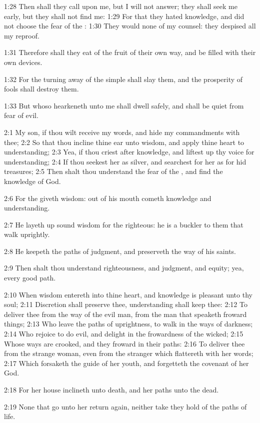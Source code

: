 1:28 Then shall they call upon me, but I will not answer; they shall
seek me early, but they shall not find me: 1:29 For that they hated
knowledge, and did not choose the fear of the \LORD: 1:30 They would
none of my counsel: they despised all my reproof.

1:31 Therefore shall they eat of the fruit of their own way, and be
filled with their own devices.

1:32 For the turning away of the simple shall slay them, and the
prosperity of fools shall destroy them.

1:33 But whoso hearkeneth unto me shall dwell safely, and shall be
quiet from fear of evil.

2:1 My son, if thou wilt receive my words, and hide my commandments
with thee; 2:2 So that thou incline thine ear unto wisdom, and apply
thine heart to understanding; 2:3 Yea, if thou criest after knowledge,
and liftest up thy voice for understanding; 2:4 If thou seekest her as
silver, and searchest for her as for hid treasures; 2:5 Then shalt
thou understand the fear of the \LORD, and find the knowledge of God.

2:6 For the \LORD giveth wisdom: out of his mouth cometh knowledge and
understanding.

2:7 He layeth up sound wisdom for the righteous: he is a buckler to
them that walk uprightly.

2:8 He keepeth the paths of judgment, and preserveth the way of his
saints.

2:9 Then shalt thou understand righteousness, and judgment, and
equity; yea, every good path.

2:10 When wisdom entereth into thine heart, and knowledge is pleasant
unto thy soul; 2:11 Discretion shall preserve thee, understanding
shall keep thee: 2:12 To deliver thee from the way of the evil man,
from the man that speaketh froward things; 2:13 Who leave the paths of
uprightness, to walk in the ways of darkness; 2:14 Who rejoice to do
evil, and delight in the frowardness of the wicked; 2:15 Whose ways
are crooked, and they froward in their paths: 2:16 To deliver thee
from the strange woman, even from the stranger which flattereth with
her words; 2:17 Which forsaketh the guide of her youth, and forgetteth
the covenant of her God.

2:18 For her house inclineth unto death, and her paths unto the dead.

2:19 None that go unto her return again, neither take they hold of the
paths of life.

